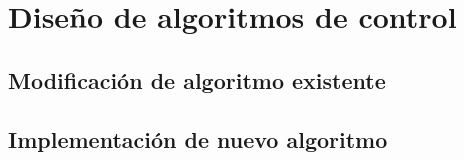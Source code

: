 \chapter{Diseño de algoritmos de control}

\section{Modificación de algoritmo existente}

\section{Implementación de nuevo algoritmo}